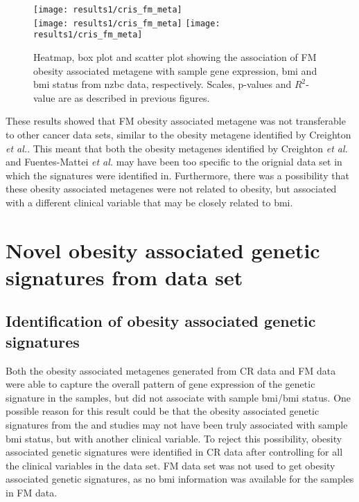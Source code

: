 \begin{figure}[htp!]
	\centering
	\texttt{[image: results1/cris\_fm\_meta]}\\
	\vspace{1em}
	\texttt{[image: results1/cris\_fm\_meta]}
	\hfill
	\texttt{[image: results1/cris\_fm\_meta]}
	\caption[FM metagene in \gls{nzbc} data]{Heatmap, box plot and scatter plot showing the association of FM obesity associated metagene with sample gene expression, \gls{bmi} and \gls{bmi} status from \gls{nzbc} data, respectively.
	Scales, p-values and $R^2$-value are as described in previous figures.}
	\label{fig:fmmetacris}
\end{figure}

\noindent
These results showed that FM obesity associated metagene was not transferable to other cancer data sets, similar to the obesity metagene identified by Creighton \textit{et al.}.
This meant that both the obesity metagenes identified by Creighton \textit{et al.} and Fuentes-Mattei \textit{et al.} may have been too specific to the orignial data set in which the signatures were identified in.
Furthermore, there was a possibility that these obesity associated metagenes were not related to obesity, but associated with a different clinical variable that may be closely related to \gls{bmi}.

\section{Novel obesity associated genetic signatures from \citet{Creighton2012} data set}
\label{sec:creighton_obesity_metagene_new}

\subsection{Identification of obesity associated genetic signatures}
\label{sub:identification_of_obesity_associated_genetic_signatures}

Both the obesity associated metagenes generated from CR data and FM data were able to capture the overall pattern of gene expression of the genetic signature in the samples, but did not associate with sample \gls{bmi}/\gls{bmi} status.
One possible reason for this result could be that the obesity associated genetic signatures from the \citet{Creighton2012} and \citet{Fuente-Matter2014} studies may not have been truly associated with sample \gls{bmi}  status, but with another clinical variable.
To reject this possibility, obesity associated genetic signatures were identified in CR data after controlling for all the clinical variables in the data set.
FM data set was not used to get obesity associated genetic signatures, as no \gls{bmi} information was available for the samples in FM data.


